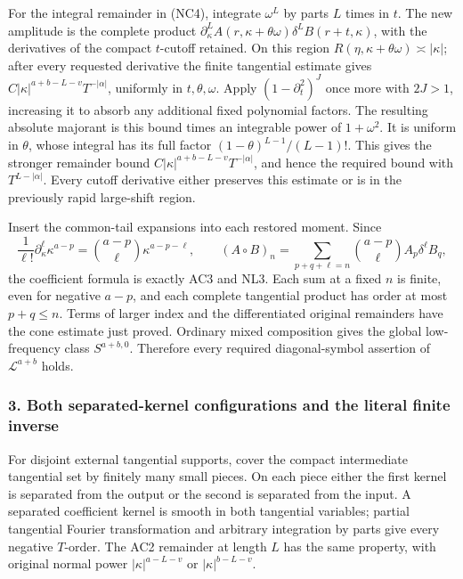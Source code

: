 \documentclass[
  11pt,
]{article}
\begin{document}
For the integral remainder in (NC4), integrate \(\omega^L\) by parts
\(L\) times in \(t\). The new amplitude is the complete product
\(\partial_\kappa^L A(r,\kappa+\theta\omega)\delta^L B(r+t,\kappa)\),
with the derivatives of the compact \(t\)-cutoff retained. On this
region \(R(\eta,\kappa+\theta\omega)\asymp|\kappa|\); after every
requested derivative the finite tangential estimate gives
\(C|\kappa|^{a+b-L-v}T^{-|\alpha|}\), uniformly in \(t,\theta,\omega\).
Apply \((1-\partial_t^2)^J\) once more with \(2J>1\), increasing it to
absorb any additional fixed polynomial factors. The resulting absolute
majorant is this bound times an integrable power of \(1+\omega^2\). It
is uniform in \(\theta\), whose integral has its full factor
\((1-\theta)^{L-1}/(L-1)!\). This gives the stronger remainder bound
\(C|\kappa|^{a+b-L-v}T^{-|\alpha|}\), and hence the required bound with
\(T^{L-|\alpha|}\). Every cutoff derivative either preserves this
estimate or is in the previously rapid large-shift region.

Insert the common-tail expansions into each restored moment. Since \[
 \frac1{\ell!}\partial_\kappa^\ell\kappa^{a-p}
     =\binom{a-p}{\ell}\kappa^{a-p-\ell},
 \qquad
 (A\circ B)_n
     =\sum_{p+q+\ell=n}
        \binom{a-p}{\ell}A_p\delta^\ell B_q,
 \tag{NC6}
\] the coefficient formula is exactly AC3 and NL3. Each sum at a fixed
\(n\) is finite, even for negative \(a-p\), and each complete tangential
product has order at most \(p+q\leq n\). Terms of larger index and the
differentiated original remainders have the cone estimate just proved.
Ordinary mixed composition gives the global low-frequency class
\(S^{a+b,0}\). Therefore every required diagonal-symbol assertion of
\(\mathcal L^{a+b}\) holds.

\subsubsection{3. Both separated-kernel configurations and the literal
finite
inverse}\label{both-separated-kernel-configurations-and-the-literal-finite-inverse}

For disjoint external tangential supports, cover the compact
intermediate tangential set by finitely many small pieces. On each piece
either the first kernel is separated from the output or the second is
separated from the input. A separated coefficient kernel is smooth in
both tangential variables; partial tangential Fourier transformation and
arbitrary integration by parts give every negative \(T\)-order. The AC2
remainder at length \(L\) has the same property, with original normal
power \(|\kappa|^{a-L-v}\) or \(|\kappa|^{b-L-v}\).
\end{document}
